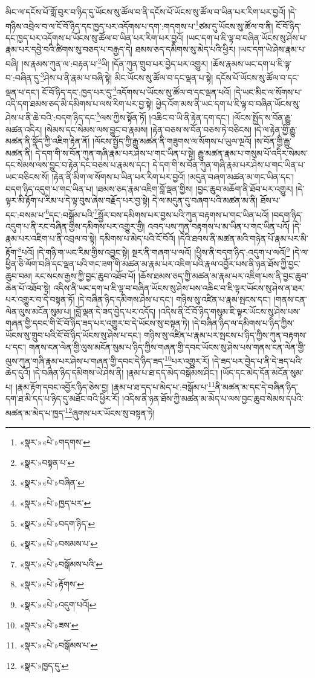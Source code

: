 མིང་ལ་དངོས་པོ་གློ་བུར་བ་ཉིད་དུ་ཡོངས་སུ་ཚོལ་བ་ནི་དངོས་པོ་ཡོངས་སུ་ཚོལ་བ་ཡིན་པར་རིག་པར་བྱའོ། །དེ་གཉིས་འབྲེལ་བ་ལ་ངོ་བོ་ཉིད་དང་ཁྱད་པར་འདོགས་པ་དག་:གདགས་པ་\footnote{«སྣར་»«པེ་»གདགས་}ཙམ་དུ་ཡོངས་སུ་ཚོལ་བ་ནི། ངོ་བོ་ཉིད་དང་ཁྱད་པར་འདོགས་པ་ཡོངས་སུ་ཚོལ་བ་ཡིན་པར་རིག་པར་བྱའོ། །ཡང་དག་པ་ཇི་ལྟ་བ་བཞིན་ཡོངས་སུ་ཤེས་པ་རྣམ་པར་དབྱེ་བའི་ཚིགས་སུ་བཅད་པ་བརྒྱད་དེ། ཐམས་ཅད་དམིགས་སུ་མེད་པའི་ཕྱིར། །ཡང་དག་ཡེ་ཤེས་རྣམ་པ་བཞི། །ས་རྣམས་ཀུན་ལ་:བརྟན་པ་\footnote{«སྣར་»བསྟན་པ་}ཡི། །དོན་ཀུན་གྲུབ་པར་བྱེད་པར་འགྱུར། །ཆོས་རྣམས་ཡང་དག་པ་ཇི་ལྟ་བ་:བཞིན་དུ་\footnote{«སྣར་»«པེ་»བཞིན་}ཤེས་པ་ནི་རྣམ་པ་བཞི་སྟེ། མིང་ཡོངས་སུ་ཚོལ་བ་དང་ལྡན་པ་སྟེ། དངོས་པོ་ཡོངས་སུ་ཚོལ་བ་དང་ལྡན་པ་དང་། ངོ་བོ་ཉིད་དང་:ཁྱད་པར་དུ་\footnote{«སྣར་»«པེ་»ཁྱད་པར་}འདོགས་པ་ཡོངས་སུ་ཚོལ་བ་དང་ལྡན་པའོ། །དེ་ཡང་མིང་ལ་སོགས་པ་འདི་དག་ཐམས་ཅད་མི་དམིགས་པ་ལས་རིག་པར་བྱ་སྟེ། ཕྱེད་འོག་མས་ནི་ཡང་དག་པ་ཇི་ལྟ་བ་བཞིན་ཡོངས་སུ་ཤེས་པ་ནི་ཆེ་བའི་:བདག་ཉིད་དང་\footnote{«སྣར་»«པེ་»བདག་ཉིད་}ལས་ཀྱིས་སྟོན་ཏོ། །འཆིང་བ་ཡི་ནི་རྟེན་དག་དང་། །ལོངས་སྤྱོད་ས་བོན་རྒྱུ་མཚན་འདིར། །སེམས་དང་སེམས་ལས་བྱུང་བ་རྣམས། །རྟེན་བཅས་ས་བོན་བཅས་ཏེ་བཅིངས། །དེ་ལ་རྟེན་གྱི་རྒྱུ་མཚན་ནི་སྣོད་ཀྱི་འཇིག་རྟེན་ནོ། །ལོངས་སྤྱོད་ཀྱི་རྒྱུ་མཚན་ནི་གཟུགས་ལ་སོགས་པ་ཡུལ་ལྔའོ། །ས་བོན་གྱི་རྒྱུ་མཚན་ནི། དེ་དག་གི་ས་བོན་ཀུན་གཞི་རྣམ་པར་ཤེས་པ་གང་ཡིན་པ་སྟེ། རྒྱུ་མཚན་རྣམ་པ་གསུམ་པོ་འདིར་སེམས་དང་སེམས་ལས་བྱུང་བ་རྟེན་དང་བཅས་པ་རྣམས་དང་། དེ་དག་གི་ས་བོན་ཀུན་གཞི་རྣམ་པར་ཤེས་པ་གང་ཡིན་པ་ཡང་བཅིངས་སོ། །རྟེན་ནི་མིག་ལ་སོགས་པ་ཡིན་པར་རིག་པར་བྱའོ། །མདུན་བཞག་མཚན་མ་གང་ཡིན་དང་། བདག་ཉིད་འདུག་པ་གང་ཡིན་པ། །ཐམས་ཅད་རྣམ་འཇིག་བློ་ལྡན་གྱིས། །བྱང་ཆུབ་མཆོག་ནི་ཐོབ་པར་འགྱུར། །དེ་ལྟར་མི་རྟོག་པ་རིམ་པ་དེ་ལྟ་བུས་ཞེས་བརྗོད་པར་བྱ་སྟེ། དེ་ལ་མདུན་དུ་བཞག་པའི་མཚན་མ་ནི། ཐོས་པ་དང་:བསམ་པ་\footnote{«སྣར་»«པེ་»བསམས་པ་}དང་:བསྒོམ་པའི་\footnote{«སྣར་»«པེ་»བསྒོམས་པའི་}སྦྱོར་བས་དམིགས་པར་བྱས་པའི་ཀུན་བརྟགས་པ་གང་ཡིན་པའོ། །བདག་ཉིད་འདུག་པ་ནི་རང་བཞིན་གྱིས་དམིགས་པར་འགྱུར་གྱི། འབད་པས་ཀུན་བརྟགས་པ་མ་ཡིན་པ་གང་ཡིན་པའོ། །དེ་རྣམ་པར་འཇིག་པ་ནི་འབྲལ་བ་སྟེ། དམིགས་པ་མེད་པའི་ངོ་བོའོ། །དེའི་ཐབས་ནི་མཚན་མའི་གཉེན་པོ་རྣམ་པར་མི་རྟོག་\footnote{«སྣར་»«པེ་»རྟོགས་}པའོ། །དེ་གཉི་ག་ཡང་རིམ་གྱིས་འབྱུང་སྟེ། སྔར་ནི་གཞག་པ་ལའོ། །ཕྱིས་ནི་བདག་ཉིད་:འདུག་པ་ལའོ།\footnote{«སྣར་»«པེ་»འདུག་པའོ།} །དེ་ལ་ཕྱིན་ཅི་ལོག་བཞི་དང་ལྡན་པའི་གང་ཟག་གི་མཚན་མ་རྣམ་པར་འཇིག་པའི་རྣལ་འབྱོར་པས་ནི་ཉན་ཐོས་ཀྱི་བྱང་ཆུབ་བམ། རང་སངས་རྒྱས་ཀྱི་བྱང་ཆུབ་འཐོབ་པོ། །ཆོས་ཐམས་ཅད་ཀྱི་མཚན་མ་རྣམ་པར་འཇིག་པས་ནི་བྱང་ཆུབ་ཆེན་པོ་འཐོབ་སྟེ། འདིས་ནི་ཡང་དག་པ་ཇི་ལྟ་བ་བཞིན་ཡོངས་སུ་ཤེས་པས་འཆིང་བ་ཇི་ལྟར་ཡོངས་སུ་ཤེས་ན་ཐར་པར་འགྱུར་བ་དེ་བསྟན་ཏོ། །དེ་བཞིན་ཉིད་དམིགས་ཤེས་པ་དང་། གཉིས་སུ་འཛིན་པ་རྣམ་སྤངས་དང་། །གནས་ངན་ལེན་ལུས་མངོན་སུམ་པ། །བློ་ལྡན་དེ་ཟད་བྱེད་པར་འདོད། །འདིས་ནི་ངོ་བོ་ཉིད་གསུམ་ཇི་ལྟར་ཡོངས་སུ་ཤེས་པས་གཞན་གྱི་དབང་གི་ངོ་བོ་ཉིད་ཟད་པར་འགྱུར་བ་དེ་ཡོངས་སུ་བསྟན་ཏེ། །དེ་བཞིན་ཉིད་ལ་དམིགས་པ་ཉིད་ཀྱིས་ཡོངས་སུ་གྲུབ་པའི་ངོ་བོ་ཉིད་ཡོངས་སུ་ཤེས་པ་དང་། གཉིས་སུ་འཛིན་པ་རྣམ་པར་སྤངས་པ་ཉིད་ཀྱིས་ཀུན་བརྟགས་པ་དང་། གནས་ངན་ལེན་གྱི་ལུས་མངོན་སུམ་པ་ཉིད་ཀྱིས་གཞན་གྱི་དབང་ཡོངས་སུ་ཤེས་པས་གནས་ངན་ལེན་གྱི་ལུས་ཀུན་གཞི་རྣམ་པར་ཤེས་པ་གཞན་གྱི་དབང་དེ་ཉིད་ཟད་\footnote{«སྣར་»«པེ་»ཟས་}པར་འགྱུར་རོ། །དེ་ཟད་པར་བྱེད་པ་ནི་དེ་ཟད་པའི་ཆེད་དུའོ། །དེ་བཞིན་ཉིད་དམིགས་ཡེ་ཤེས་ནི། །རྣམ་པ་ཐ་དད་མེད་བསྒོམས་ཤིང་། །ཡོད་དང་མེད་དོན་མངོན་སུམ་པ། །རྣམ་རྟོག་དབང་འབྱོར་ཉིད་ཅེས་བྱ། །རྣམ་པ་ཐ་དད་པ་མེད་པ་:བསྒོམ་པ་\footnote{«སྣར་»«པེ་»བསྒོམས་པ་}ནི་མཚན་མ་དང་དེ་བཞིན་ཉིད་དག་ཐ་མི་དད་པ་ཉིད་དུ་མཐོང་བའི་ཕྱིར་རོ། །འདིས་ནི་ཉན་ཐོས་ཀྱི་མཚན་མ་མེད་པ་ལས་བྱང་ཆུབ་སེམས་དཔའི་མཚན་མ་མེད་པ་ཁྱད་\footnote{«སྣར་»ཁྱད་དུ་}ཞུགས་པར་ཡོངས་སུ་བསྟན་ཏེ། 